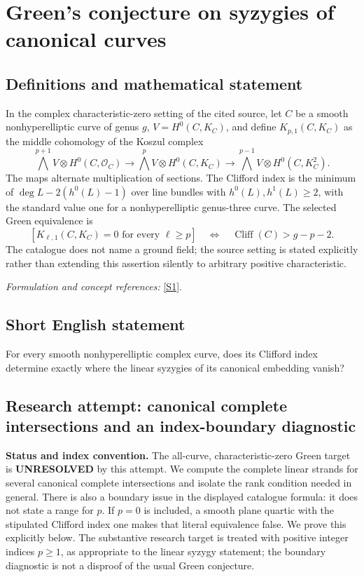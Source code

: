\documentclass[11pt]{article}
\begin{document}
\section*{\texorpdfstring{Green's conjecture on syzygies of canonical curves}{Green's conjecture on syzygies of canonical curves}}\label{385}
\subsection{Definitions and mathematical statement}
In the complex characteristic-zero setting of the cited source, let $C$ be a smooth nonhyperelliptic curve of genus $g$, $V=H^0(C,K_C)$, and define $K_{p,1}(C,K_C)$ as the middle cohomology of the Koszul complex
\[
 \bigwedge^{p+1}V\otimes H^0(C,\mathcal O_C)
 \longrightarrow\bigwedge^pV\otimes H^0(C,K_C)
 \longrightarrow\bigwedge^{p-1}V\otimes H^0(C,K_C^2).
\]
The maps alternate multiplication of sections. The Clifford index is the minimum of $\deg L-2(h^0(L)-1)$ over line bundles with $h^0(L),h^1(L)\ge2$, with the standard value one for a nonhyperelliptic genus-three curve. The selected Green equivalence is
\[
 [K_{\ell,1}(C,K_C)=0\text{ for every }\ell\ge p]
 \quad\Longleftrightarrow\quad\operatorname{Cliff}(C)>g-p-2.
\]
The catalogue does not name a ground field; the source setting is stated explicitly rather than extending this assertion silently to arbitrary positive characteristic.
\par\smallskip\textit{Formulation and concept references:} \href{https://webusers.imj-prg.fr/~claire.voisin/Articlesweb/syzod.pdf}{[S1]}.

\subsection{Short English statement}
For every smooth nonhyperelliptic complex curve, does its Clifford index determine exactly where the linear syzygies of its canonical embedding vanish?
\subsection{Research attempt: canonical complete intersections and an index-boundary diagnostic}
\textbf{Status and index convention.} The all-curve, characteristic-zero Green target is \textbf{UNRESOLVED} by this attempt. We compute the complete linear strands for several canonical complete intersections and isolate the rank condition needed in general. There is also a boundary issue in the displayed catalogue formula: it does not state a range for $p$. If $p=0$ is included, a smooth plane quartic with the stipulated Clifford index one makes that literal equivalence false. We prove this explicitly below. The substantive research target is treated with positive integer indices $p\ge1$, as appropriate to the linear syzygy statement; the boundary diagnostic is not a disproof of the usual Green conjecture.
\end{document}
